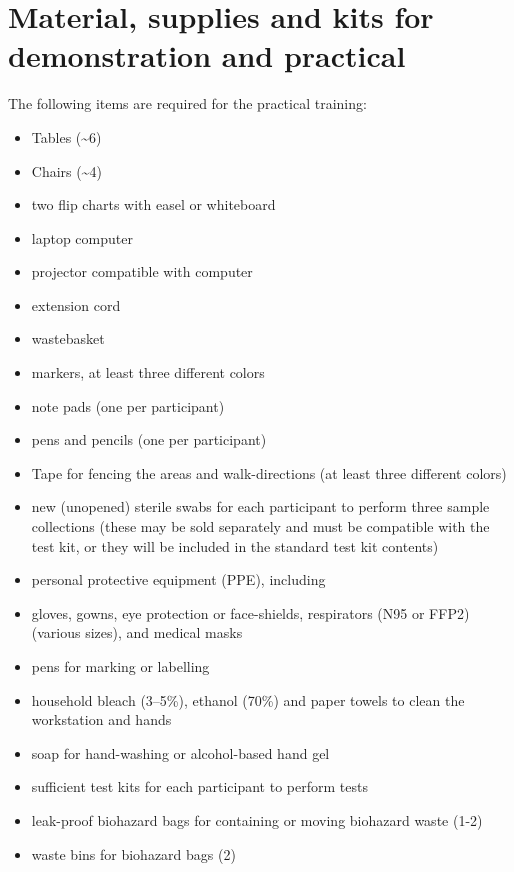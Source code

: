 \documentclass[
]{book}
\providecommand{\tightlist}{%
  \setlength{\itemsep}{0pt}\setlength{\parskip}{0pt}}
\begin{document}
\hypertarget{material-supplies-and-kits-for-demonstration-and-practical}{%
\section{Material, supplies and kits for demonstration and practical}\label{material-supplies-and-kits-for-demonstration-and-practical}}

The following items are required for the practical training:

\begin{itemize}
\tightlist
\item
  Tables (\textasciitilde6)
\item
  Chairs (\textasciitilde4)
\item
  two flip charts with easel or whiteboard
\item
  laptop computer
\item
  projector compatible with computer
\item
  extension cord
\item
  wastebasket
\item
  markers, at least three different colors
\item
  note pads (one per participant)
\item
  pens and pencils (one per participant)
\item
  Tape for fencing the areas and walk-directions (at least three different
  colors)
\item
  new (unopened) sterile swabs for each participant to perform three
  sample collections (these may be sold separately and must be compatible
  with the test kit, or they will be included in the standard test kit
  contents)
\item
  personal protective equipment (PPE), including
\item
  gloves, gowns, eye protection or face-shields, respirators (N95 or FFP2) (various sizes), and medical masks
\item
  pens for marking or labelling
\item
  household bleach (3--5\%), ethanol (70\%) and paper towels to clean the
  workstation and hands
\item
  soap for hand-washing or alcohol-based hand gel
\item
  sufficient test kits for each participant to perform tests
\item
  leak-proof biohazard bags for containing or moving biohazard waste (1-2)
\item
  waste bins for biohazard bags (2)

\end{itemize}
\end{document}
